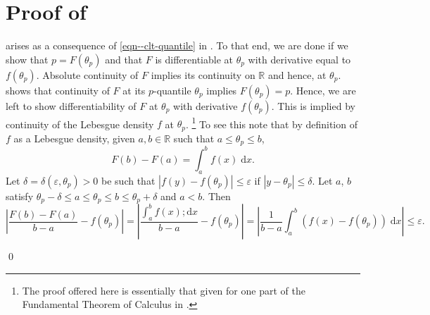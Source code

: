 
\section{Proof of \texorpdfstring{}{Corollary
\ref{cor--clt-quantile}}}
\label{sec--prf--cor--clt-quantile}

 arises as a consequence of
\eqref{eqn--clt-quantile} in .
To that end, we are done if we show that \(p = F \left( \theta_{p} \right)\)
and that \(F\) is differentiable at \(\theta_{p}\) with derivative equal to \(f
\left( \theta_{p} \right)\).
Absolute continuity of \(F\) implies its continuity on \(\mathbb{R}\) and hence,
at \(\theta_{p}\).
 shows that continuity of \(F\) at its
\(p\)-quantile \(\theta_{p}\) implies \(F \left( \theta_{p} \right) = p\).
Hence, we are left to show differentiability of \(F\) at \(\theta_{p}\) with
derivative \(f \left( \theta_{p} \right)\).
This is implied by continuity of the Lebesgue density \(f\) at \(\theta_{p}\).%
\footnote{The proof offered here is essentially that given for one part of the
Fundamental Theorem of Calculus in \citet[Theorem 6.20,
pp. 133-134]{1976rudinPrinciplesMathematicalAnalysis}.}
To see this note that by definition of \(f\) as a Lebesgue density,
given \(a, b \in \mathbb{R}\) such that \(a \leq \theta_{p} \leq b\),
\begin{equation*}
  F (b) - F (a) = \int_{a}^{b} f (x) \; \mathrm{d} x.
\end{equation*}
Let \(\delta = \delta \left( \varepsilon, \theta_{p} \right) > 0\) be such that
\(\left| f (y) - f \left( \theta_{p} \right) \right| \leq \varepsilon\) if
\(\left| y - \theta_{p} \right| \leq \delta\).
Let \(a\), \(b\) satisfy \(\theta_{p} - \delta \leq a \leq \theta_{p} \leq b
\leq \theta_{p} + \delta\) and \(a < b\).
Then
\begin{equation*}
  \left| \frac{F (b) - F (a)}{b - a} - f \left( \theta_{p} \right) \right| =
  \left| \frac{\int_{a}^{b} f (x) ; \mathrm{d} x}{b - a} - f \left( \theta_{p}
  \right) \right| = \left| \frac{1}{b - a} \int_{a}^{b} \left( f (x) - f \left(
  \theta_{p} \right) \right) \; \mathrm{d} x \right| \leq \varepsilon.
\end{equation*}

\qed


